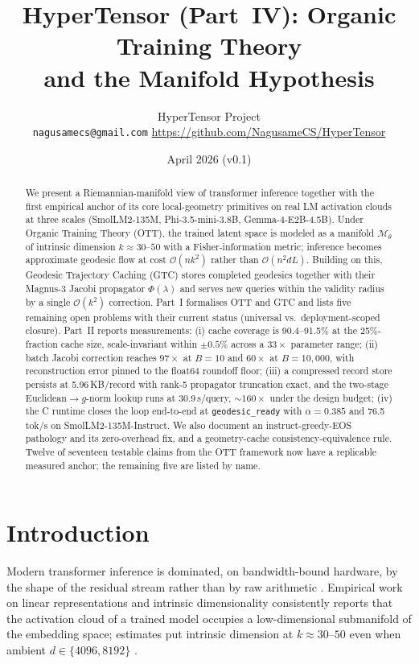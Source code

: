 \documentclass[11pt]{article}
\title{HyperTensor (Part~IV): Organic Training Theory\\and the Manifold Hypothesis}
\author{HyperTensor Project\\[2pt]
\small \texttt{nagusamecs@gmail.com} \quad \url{https://github.com/NagusameCS/HyperTensor}}
\date{April 2026 (v0.1)}
\begin{document}
\maketitle
\hypertensorbanner

\begin{abstract}
We present a Riemannian-manifold view of transformer inference together with the
first empirical anchor of its core local-geometry primitives on real LM activation
clouds at three scales (SmolLM2-135M, Phi-3.5-mini-3.8B, Gemma-4-E2B-4.5B).
Under Organic Training Theory (OTT), the trained latent space is modeled as
a manifold $\mathcal{M}_\theta$ of intrinsic dimension $k\!\approx\!30$--$50$ with
a Fisher-information metric; inference becomes approximate geodesic flow at
cost $\mathcal{O}(nk^2)$ rather than $\mathcal{O}(n^2 dL)$.
Building on this, Geodesic Trajectory Caching (GTC) stores completed
geodesics together with their Magnus-3 Jacobi propagator $\Phi(\lambda)$ and
serves new queries within the validity radius by a single $\mathcal{O}(k^2)$
correction. Part~I formalises OTT and GTC and lists five remaining open
problems with their current status (universal vs.\ deployment-scoped closure).
Part~II reports measurements: (i) cache coverage is
90.4--91.5\% at the 25\%-fraction cache size, scale-invariant within
$\pm 0.5\%$ across a $33\times$ parameter range; (ii) batch Jacobi correction
reaches $97\times$ at $B=10$ and $60\times$ at $B=10{,}000$, with
reconstruction error pinned to the float64 roundoff floor; (iii) a compressed
record store persists at 5.96\,KB/record with rank-5 propagator
truncation exact, and the two-stage Euclidean$\to g$-norm lookup runs at
30.9\,\textmu s/query, $\sim\!160\times$ under the design budget; (iv)
the C runtime closes the loop end-to-end at \texttt{geodesic\_ready} with
$\alpha=0.385$ and 76.5\,tok/s on SmolLM2-135M-Instruct. We also document an
instruct-greedy-EOS pathology and its zero-overhead fix, and a
geometry-cache consistency-equivalence rule. Twelve of seventeen testable
claims from the OTT framework now have a replicable measured anchor; the
remaining five are listed by name.
\end{abstract}

\section{Introduction}

Modern transformer inference is dominated, on bandwidth-bound hardware, by the
shape of the residual stream rather than by raw arithmetic
\cite{vaswani2017attention,llama3,williams2009roofline}. Empirical work on
linear representations and intrinsic dimensionality consistently reports that
the activation cloud of a trained model occupies a low-dimensional submanifold
of the embedding space; estimates put intrinsic dimension at $k\!\approx\!30$--$50$
even when ambient $d\in\{4096,8192\}$
\cite{elhage2022superposition,nakkiran2021deep}.
\end{document}
